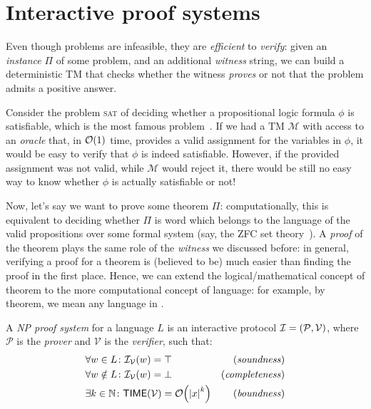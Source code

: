 \section{Interactive proof systems}
Even though \NPcomplete{} problems are infeasible, they are \emph{efficient} to \emph{verify}: 
given an \emph{instance} \(\Pi \) of some \NPcomplete{} problem, and an additional \emph{witness}
string, we can build a deterministic TM that checks whether the witness \emph{proves} or 
not that the problem admits a positive answer.
\begin{example}
  Consider the problem \textsc{sat} of deciding whether a propositional logic formula \(\phi \) is 
  satisfiable, which is the most famous \NPcomplete{} problem~\cite{Cook1971}. 
  If we had a TM \(\mathcal{M}\) with access to an \emph{oracle} that, in \(\BigO{1}\) time, 
  provides a valid assignment for the variables in \(\phi \), it would be easy to 
  verify that \(\phi \) is indeed satisfiable.
  However, if the provided assignment was not valid, while \(\mathcal{M}\) would reject it, 
  there would be still no easy way to know whether \(\phi \) is actually satisfiable or not! 
\end{example}

Now, let's say we want to prove some theorem \(\Pi \): computationally, this is equivalent to 
deciding whether \(\Pi \) is word which belongs to the language of the valid propositions over some 
formal system (say, the ZFC set theory~\cite{FraenkelHL1973}).
A \emph{proof} of the theorem plays the same role of the \emph{witness} we discussed before: in 
general, verifying a proof for a theorem is (believed to be) much easier than finding the proof in 
the first place.
Hence, we can extend the logical/mathematical concept of theorem to the more computational concept 
of language: for example, by \NPtime{} theorem, we mean any language in \NPtime{}.

\clearpage
\begin{definition}  
  A \emph{\textsc{NP} proof system} for a language \(L\) is an interactive protocol 
  \(\mathcal{I} = \left(\mathcal{P}, \mathcal{V}\right)\), where \(\mathcal{P}\) is the \emph{prover}
  and \(\mathcal{V}\) is the \emph{verifier}, such that:
  \begin{align*}
    & \forall w \in L\colon \call{\mathcal{I}_{\mathcal{V}}}{w} = \top & 
      \textnormal{(\emph{soundness})} \\
    & \forall w \notin L\colon \call{\mathcal{I}_{\mathcal{V}}}{w} = \bot & 
      \textnormal{(\emph{completeness})} \\
    & \exists k \in \mathbb{N}\colon \call{\Time}{\mathcal{V}} = \BigO{\abs{x}^k} & 
    \textnormal{(\emph{boundness})}
  \end{align*}
\end{definition}

